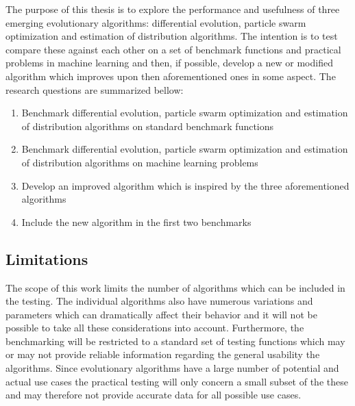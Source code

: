 The purpose of this thesis is to explore the performance and usefulness of three emerging evolutionary algorithms: differential evolution, particle swarm optimization and estimation of distribution algorithms. The intention is to test compare these against each other on a set of benchmark functions and practical problems in machine learning and then, if possible, develop a new or modified algorithm which improves upon then aforementioned ones in some aspect. The research questions are summarized bellow:

\begin{enumerate}
  \item Benchmark differential evolution, particle swarm optimization and estimation of distribution algorithms on standard benchmark functions
  \item Benchmark differential evolution, particle swarm optimization and estimation of distribution algorithms on machine learning problems
  \item Develop an improved algorithm which is inspired by the three aforementioned algorithms
  \item Include the new algorithm in the first two benchmarks
\end{enumerate}

\subsection{Limitations}

The scope of this work limits the number of algorithms which can be included in the testing. The individual algorithms also have numerous variations and parameters which can dramatically affect their behavior and it will not be possible to take all these considerations into account. Furthermore, the benchmarking will be restricted to a standard set of testing functions which may or may not provide reliable information regarding the general usability the algorithms. Since evolutionary algorithms have a large number of potential and actual use cases the practical testing will only concern a small subset of the these and may therefore not provide accurate data for all possible use cases.
